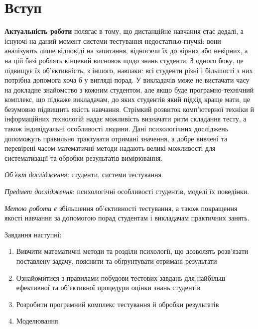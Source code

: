\chapter*{Вступ}

\textbf{Актуальність роботи} полягає в тому, що
дистанційне навчання стає дедалі, а
існуючі на даний момент системи тестування недостатньо гнучкі: вони
аналізують лише відповіді на запитання, відносячи їх до вірних або невірних,
а на цій базі роблять кінцевий висновок щодо знань студента.
З одного боку, це підвищує їх об’єктивність, з іншого, навпаки: всі студенти
різні і більшості з них потрібна допомога хоча б у вигляді порад.
У викладачів може не вистачати часу на докладне знайомство з кожним студентом,
але якщо буде програмно-технічний комплекс, що підкаже викладачам, до яких
студентів який підхід краще мати, це безумовно підвищить якість навчання.
Стрімкий розвиток комп’ютерної техніки й інформаційних технологій надає
можливість визначати ритм складання тесту, а також індивідуальні особливості
людини.
Дані психологічних досліджень допоможуть правильно трактувати отримані
значення, а добре вивчені та перевірені часом математичні методи надають
великі можливості для систематизації та обробки результатів вимірювання.

\textit{Об’єкт дослідження}:
студенти, системи тестування.

\textit{Предмет дослідження}:
психологічні особливості студентів, моделі їх поведінки.

\textit{Метою роботи є}
збільшення об’єктивності тестування, а також покращення
якості навчання за допомогою порад студентам і викладачам практичних занять.

Завдання наступні:
\begin{enumerate}
  \item
    Вивчити математичні методи та розділи психології, що дозволять розв’язати
    поставлену задачу, пояснити та обґрунтувати отримані результати
  \item
    Ознайомитися з правилами побудови тестових завдань для найбільш
    ефективної та об’єктивної процедури оцінки знань студентів
  \item
    Розробити програмний комплекс тестування й обробки результатів
  \item
    Моделювання
\end{enumerate}


